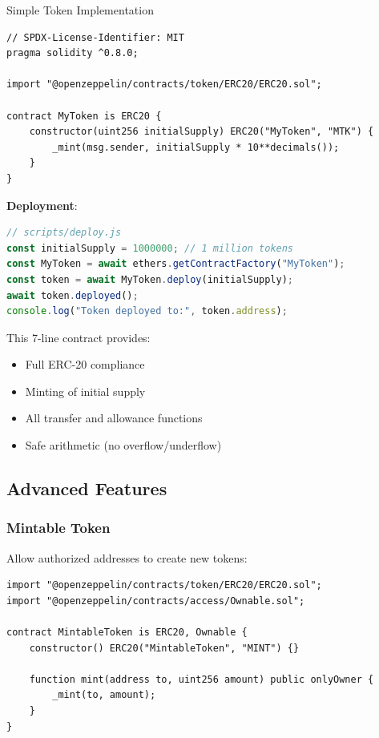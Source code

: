 \documentclass[11pt,a4paper]{article}
\begin{document}
\begin{examplebox}{Simple Token Implementation}
\begin{lstlisting}[language=Solidity]
// SPDX-License-Identifier: MIT
pragma solidity ^0.8.0;

import "@openzeppelin/contracts/token/ERC20/ERC20.sol";

contract MyToken is ERC20 {
    constructor(uint256 initialSupply) ERC20("MyToken", "MTK") {
        _mint(msg.sender, initialSupply * 10**decimals());
    }
}
\end{lstlisting}

\textbf{Deployment}:
\begin{lstlisting}[language=JavaScript]
// scripts/deploy.js
const initialSupply = 1000000; // 1 million tokens
const MyToken = await ethers.getContractFactory("MyToken");
const token = await MyToken.deploy(initialSupply);
await token.deployed();
console.log("Token deployed to:", token.address);
\end{lstlisting}

This 7-line contract provides:
\begin{itemize}
  \item Full ERC-20 compliance
  \item Minting of initial supply
  \item All transfer and allowance functions
  \item Safe arithmetic (no overflow/underflow)
\end{itemize}
\end{examplebox}

\subsection{Advanced Features}

\subsubsection{Mintable Token}

Allow authorized addresses to create new tokens:

\begin{lstlisting}[language=Solidity]
import "@openzeppelin/contracts/token/ERC20/ERC20.sol";
import "@openzeppelin/contracts/access/Ownable.sol";

contract MintableToken is ERC20, Ownable {
    constructor() ERC20("MintableToken", "MINT") {}

    function mint(address to, uint256 amount) public onlyOwner {
        _mint(to, amount);
    }
}
\end{lstlisting}
\end{document}
